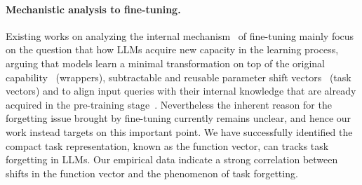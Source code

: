 \paragraph{Mechanistic analysis to fine-tuning.}
Existing works on analyzing the internal mechanism~\citep{räuker2023transparent,ferrando2024primer} of fine-tuning mainly focus on the question that how LLMs acquire new capacity in the learning process, arguing that models learn a minimal transformation on top of the original capability~\citep{jain2024mechanistically} (wrappers), subtractable and reusable parameter shift vectors~\citep{huang2024chat,gao2024ethos} (task vectors) and to align input queries with their internal knowledge that are already acquired in the pre-training stage~\citep{ren2024learning}. 
Nevertheless the inherent reason for the forgetting issue brought by fine-tuning currently remains unclear, and hence our work instead targets on this important point. We have successfully identified the compact task representation, known as the function vector, can tracks task forgetting in LLMs. Our empirical data indicate a strong correlation between shifts in the function vector and the phenomenon of task forgetting.
